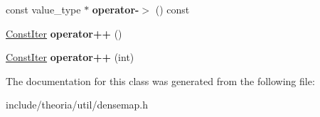 \begin{DoxyCompactItemize}
\item 
\hypertarget{classtheoria_1_1util_1_1densemap_1_1ConstIter_a8125b0eec84d2f34ec203b4f2cdddd51}{const value\+\_\+type $\ast$ {\bfseries operator-\/$>$} () const }\label{classtheoria_1_1util_1_1densemap_1_1ConstIter_a8125b0eec84d2f34ec203b4f2cdddd51}

\item 
\hypertarget{classtheoria_1_1util_1_1densemap_1_1ConstIter_a7dba18b534ffdf71354b4b5789aea3a1}{\hyperlink{classtheoria_1_1util_1_1densemap_1_1ConstIter}{Const\+Iter} {\bfseries operator++} ()}\label{classtheoria_1_1util_1_1densemap_1_1ConstIter_a7dba18b534ffdf71354b4b5789aea3a1}

\item 
\hypertarget{classtheoria_1_1util_1_1densemap_1_1ConstIter_a8ca98e8a181d846c7c8412192f59da95}{\hyperlink{classtheoria_1_1util_1_1densemap_1_1ConstIter}{Const\+Iter} {\bfseries operator++} (int)}\label{classtheoria_1_1util_1_1densemap_1_1ConstIter_a8ca98e8a181d846c7c8412192f59da95}

\end{DoxyCompactItemize}


The documentation for this class was generated from the following file\+:\begin{DoxyCompactItemize}
\item 
include/theoria/util/densemap.\+h\end{DoxyCompactItemize}
